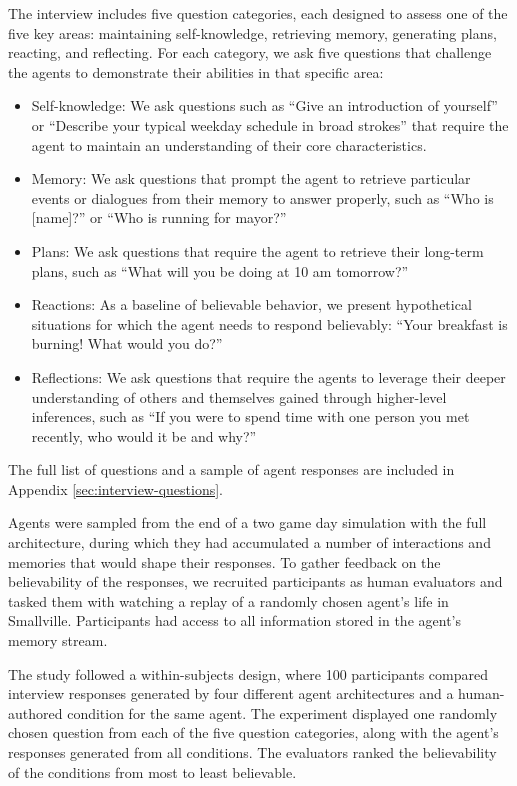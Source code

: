 The interview includes five question categories, each designed to assess one of the five key areas: maintaining self-knowledge, retrieving memory, generating plans, reacting, and reflecting. For each category, we ask five questions that challenge the agents to demonstrate their abilities in that specific area:
\begin{itemize}
\item Self-knowledge: We ask questions such as “Give an introduction of yourself” or “Describe your typical weekday schedule in broad strokes” that require the agent to maintain an understanding of their core characteristics.
\item Memory: We ask questions that prompt the agent to retrieve particular events or dialogues from their memory to answer properly, such as “Who is [name]?” or “Who is running for mayor?”
\item Plans: We ask questions that require the agent to retrieve their long-term plans, such as “What will you be doing at 10 am tomorrow?” 
\item Reactions: As a baseline of believable behavior, we present hypothetical situations for which the agent needs to respond believably: “Your breakfast is burning! What would you do?”
\item Reflections: We ask questions that require the agents to leverage their deeper understanding of others and themselves gained through higher-level inferences, such as “If you were to spend time with one person you met recently, who would it be and why?”
\end{itemize}
The full list of questions and a sample of agent responses are included in Appendix \ref{sec:interview-questions}.

Agents were sampled from the end of a two game day simulation with the full architecture, during which they had accumulated a number of interactions and memories that would shape their responses. To gather feedback on the believability of the responses, we recruited participants as human evaluators and tasked them with watching a replay of a randomly chosen agent's life in Smallville. Participants had access to all information stored in the agent's memory stream.

The study followed a within-subjects design, where 100 participants compared interview responses generated by four different agent architectures and a human-authored condition for the same agent. The experiment displayed one randomly chosen question from each of the five question categories, along with the agent's responses generated from all conditions. The evaluators ranked the believability of the conditions from most to least believable.

